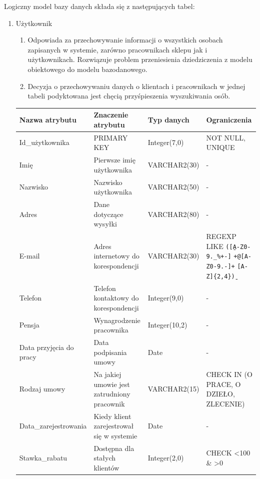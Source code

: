 Logiczny model bazy danych składa się z następujących tabel:

\begin{enumerate}
  \item Użytkownik
  	\begin{enumerate}
  	  \item Odpowiada za przechowywanie informacji o wszystkich osobach
  	  zapisanych w systemie, zarówno pracownikach sklepu jak i użytkownikach.
  	  Rozwiązuje problem przeniesienia dziedziczenia z modelu obiektowego do
  	  modelu bazodanowego.
  	  \item Decyzja o przechowywaniu danych o klientach i pracownikach w jednej
  	  tabeli podyktowana jest chęcią przyśpieszenia wyszukiwania osób.
  	\end{enumerate}
  	{\footnotesize
  	\begin{longtable}{|p{3cm}|p{5cm}|p{2.5cm}|p{2.5cm}|}
  	\hline
  	\textbf{Nazwa atrybutu} & \textbf{Znaczenie atrybutu} & \textbf{Typ danych} &
  	\textbf{Ograniczenia} \\
  	\hline
  	Id\_użytkownika & PRIMARY KEY & Integer(7,0) & NOT NULL, UNIQUE \\
	\hline
  	Imię & Pierwsze imię użytkownika & VARCHAR2(30) & - \\
	\hline
  	Nazwisko & Nazwisko użytkownika & VARCHAR2(50) & - \\
	\hline
  	Adres & Dane dotyczące wysyłki & VARCHAR2(80) & - \\
	\hline
  	E-mail & Adres internetowy do korespondencji & VARCHAR2(30) & REGEXP LIKE
  	\texttt{(\b[A-Z0-9.\_\%+-]}
  	\newline
  	\texttt{+@[A-Z0-9.-]+}
  	\newline
  	\texttt{\.[A-Z]\{2,4\}\b)}
  	 \\
 	\hline
  	Telefon & Telefon kontaktowy do korespondencji & Integer(9,0) & - \\
 	\hline
  	Pensja & Wynagrodzenie pracownika & Integer(10,2) & - \\
	\hline
  	Data przyjęcia do pracy & Data podpisania umowy & Date & - \\
	\hline
  	Rodzaj umowy & Na jakiej umowie jest zatrudniony pracownik & VARCHAR2(15) &
  	CHECK IN (O PRACE, O DZIEŁO, ZLECENIE) \\
	\hline
  	Data\_zarejestrowania & Kiedy klient zarejestrował się w systemie &
  	Date & -
  	\\
	\hline
  	Stawka\_rabatu & Dostępna dla stałych klientów & Integer(2,0) & CHECK <100 \&
  	>0
  	\\

\end{longtable}}
\end{enumerate}
